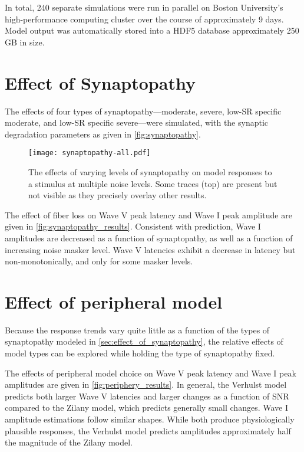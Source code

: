 In total, 240 separate simulations were run in parallel on Boston University's high-performance computing cluster over the course of approximately 9 days.  Model output was automatically stored into a HDF5 database approximately 250 GB in size.

\section{Effect of Synaptopathy} %
\label{sec:effect_of_synaptopathy}
The effects of four types of synaptopathy---moderate, severe, low-SR specific moderate, and low-SR specific severe---were simulated, with the synaptic degradation parameters as given in \autoref{fig:synaptopathy}. 

\begin{figure}[htbp]
	\centering
	\texttt{[image: synaptopathy-all.pdf]}
	\caption[Effects of Synaptopathy]{The effects of varying levels of synaptopathy on model responses to a stimulus at multiple noise levels.  Some traces (top) are present but not visible as they precisely overlay other results.}
	\label{fig:synaptopathy_results}
\end{figure}

The effect of fiber loss on Wave V peak latency and Wave I peak amplitude are given in \autoref{fig:synaptopathy_results}.  Consistent with prediction, Wave I amplitudes are decreased as a function of synaptopathy, as well as a function of increasing noise masker level.  Wave V latencies exhibit a decrease in latency but non-monotonically, and only for some masker levels.

\section{Effect of peripheral model} %
\label{sec:effect_of_peripheral_model}
Because the response trends vary quite little as a function of the types of synaptopathy modeled in \autoref{sec:effect_of_synaptopathy}, the relative effects of model types can be explored while holding the type of synaptopathy fixed. 

The effects of peripheral model choice on Wave V peak latency and Wave I peak amplitudes are given in \autoref{fig:periphery_results}.   In general, the Verhulst model predicts both larger Wave V latencies and larger changes as a function of SNR compared to the Zilany model, which predicts generally small changes.  Wave I amplitude estimations follow similar shapes.  While both produce physiologically plausible responses, the Verhulst model predicts amplitudes approximately half the magnitude of the Zilany model. 

